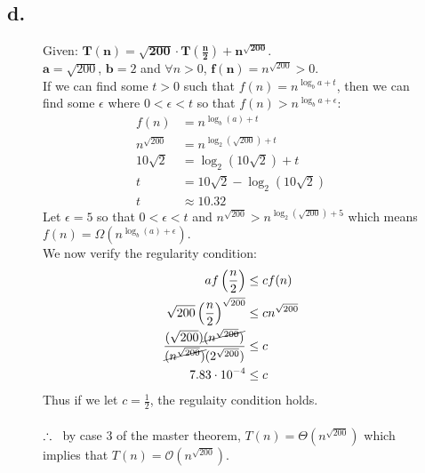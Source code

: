 \documentclass{article}
\begin{document}
        \subsection*{d.}

            \begin{figure}[!ht]
                
                \centering
                \begin{minipage}{0.9\textwidth}
                    Given: $\mathbf{T(n) = \sqrt{200} \cdot T\left(\frac{n}{2}\right) + n^{\sqrt{200}}}$.\\

                    $\mathbf{a} = \sqrt{200}$, $\mathbf{b} = 2$ and 
                    $ \forall n > 0$,  $\mathbf{f(n)} = n^{\sqrt{200}} > 0$.\\

                    If we can find some $t > 0$ such that $f(n) = n^{\log_{b}a + t}$, then we can find some $\epsilon$ where $0 < \epsilon < t$ so that $f(n) > n^{\log_{b}a + \epsilon}$:
                    \begin{align*}
                        f(n)            &=  n^{\log_{b}(a) + t}\\
                        n^{\sqrt{200}}  &=  n^{\log_{2}(\sqrt{200}) + t}\\
                        10\sqrt{2}      &=  \log_{2}(10\sqrt{2}) + t\\
                        t               &=  10\sqrt{2} - \log_{2}(10\sqrt{2})\\
                        t               &\approx 10.32
                    \end{align*}
                    Let $\epsilon = 5$ so that $0 < \epsilon < t$ and $n^{\sqrt{200}} > n^{\log_{2}(\sqrt{200}) + 5}$ which means $f(n) = \Omega({n^{\log_{b}(a) + \epsilon}})$.\\
                    We now verify the regularity condition:
                    \begin{align*}
                        af\left(\frac{n}{2}\right)                                                               &\leq  cf(n)\\
                        \sqrt{200}\left(\frac{n}{2}\right)^{\sqrt{200}}                                          &\leq  cn^{\sqrt{200}}\\
                        \frac{(\sqrt{200})\cancel{(n^{\sqrt{200}})}}{\cancel{(n^{\sqrt{200}})}(2^{\sqrt{200}})}  &\leq  c\\
                        7.83 \cdot 10^{-4}                                                                       &\leq  c
                    \end{align*}
                    Thus if we let $c = \frac{1}{2}$, the regulaity condition holds.\\\\
                    $\therefore \hspace*{5pt}$ by case 3 of the master theorem, $T(n) = \Theta(n^{\sqrt{200}})$ which implies that $T(n) = \mathcal{O}(n^{\sqrt{200}})$.
                \end{minipage}

            \end{figure}
    
\end{document}
